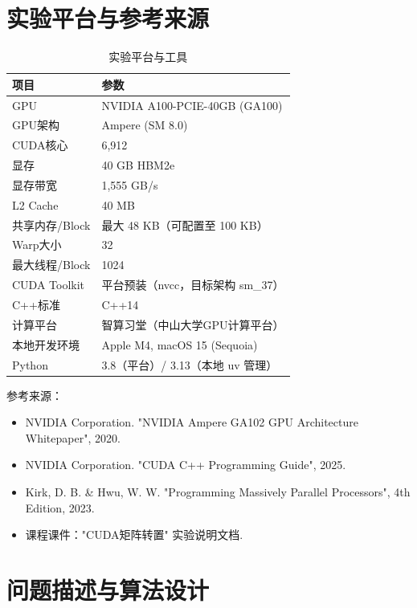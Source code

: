 \documentclass[UTF8,a4paper,12pt,fontset=none]{ctexart}
\begin{document}
\section{实验平台与参考来源}

\begin{table}[H]
  \centering
  \caption{实验平台与工具}
  \label{tab:platform}
  \begin{tabular}{ll}
    \toprule
    项目 & 参数 \\
    \midrule
    GPU & NVIDIA A100-PCIE-40GB (GA100) \\
    GPU架构 & Ampere (SM 8.0) \\
    CUDA核心 & 6,912 \\
    显存 & 40 GB HBM2e \\
    显存带宽 & 1,555 GB/s \\
    L2 Cache & 40 MB \\
    共享内存/Block & 最大 48 KB（可配置至 100 KB） \\
    Warp大小 & 32 \\
    最大线程/Block & 1024 \\
    \midrule
    CUDA Toolkit & 平台预装（nvcc，目标架构 sm\_37）\\
    C++标准 & C++14 \\
    计算平台 & 智算习堂（中山大学GPU计算平台） \\
    \midrule
    本地开发环境 & Apple M4, macOS 15 (Sequoia) \\
    Python & 3.8（平台）/ 3.13（本地 uv 管理） \\
    \bottomrule
  \end{tabular}
\end{table}

参考来源：
\begin{itemize}
  \item NVIDIA Corporation. "NVIDIA Ampere GA102 GPU Architecture Whitepaper", 2020.
  \item NVIDIA Corporation. "CUDA C++ Programming Guide", 2025.
  \item Kirk, D. B. \& Hwu, W. W. "Programming Massively Parallel Processors", 4th Edition, 2023.
  \item 课程课件："CUDA矩阵转置" 实验说明文档.
\end{itemize}

\section{问题描述与算法设计}
\end{document}
